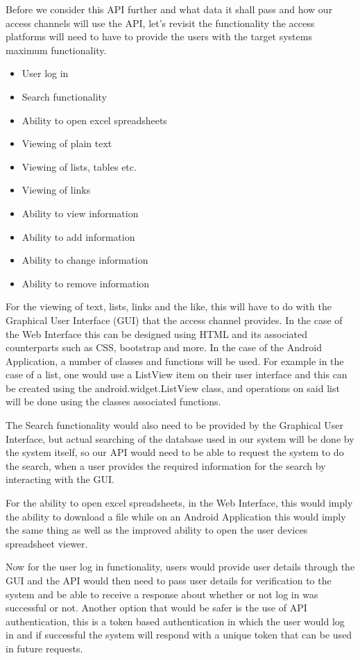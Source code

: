 \documentclass{article}
\begin{document}
Before we consider this API further and what data it shall pass and how our access channels will use the API, let’s revisit the functionality the access platforms will need to have to provide the users with the target systems maximum functionality.
\begin{itemize}
	\item User log in
	\item Search functionality
	\item Ability to open excel spreadsheets
	\item Viewing of plain text
	\item Viewing of lists, tables etc.
	\item Viewing of links
	\item Ability to view information
	\item Ability to add information
	\item Ability to change information
	\item Ability to remove information
\end{itemize}

For the viewing of text, lists, links and the like, this will have to do with the Graphical User Interface (GUI) that the access channel provides. In the case of the Web Interface this can be designed using HTML and its associated counterparts such as CSS, bootstrap and more. In the case of the Android Application, a number of classes and functions will be used. For example in the case of a list, one would use a ListView item on their user interface and this can be created using the android.widget.ListView class, and operations on said list will be done using the classes associated functions.

The Search functionality would also need to be provided by the Graphical User Interface, but actual searching of the database used in our system will be done by the system itself, so our API would need to be able to request the system to do the search, when a user provides the required information for the search by interacting with the GUI.

For the ability to open excel spreadsheets, in the Web Interface, this would imply the ability to download a file while on an Android Application this would imply the same thing as well as the improved ability to open the user devices spreadsheet viewer.

Now for the user log in functionality, users would provide user details through the GUI and the API would then need to pass user details for verification to the system and be able to receive a response about whether or not log in was successful or not. Another option that would be safer is the use of API authentication, this is a token based authentication in which the user would log in and if successful the system will respond with a unique token that can be used in future requests.
\end{document}

